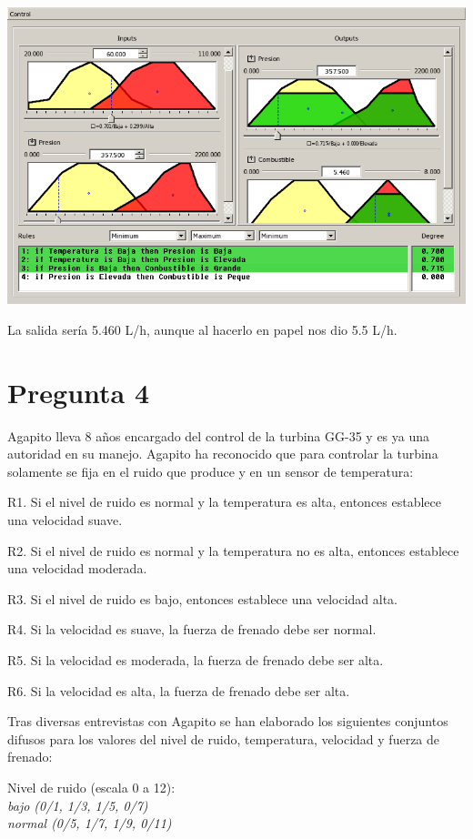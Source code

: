 \documentclass{article}
\newcommand\tab[1][1cm]{\hspace*{#1}}
\begin{document}
\begin{center}
\includegraphics[scale=0.5]{images/ej32.png}
\end{center}

La salida sería 5.460 L/h, aunque al hacerlo en papel nos dio 5.5 L/h.

\section{Pregunta 4}

Agapito lleva 8 años encargado del control de la turbina GG-35 y es ya una autoridad en su manejo. Agapito ha reconocido que para controlar la turbina solamente
se fija en el ruido que produce y en un sensor de temperatura:

R1. Si el nivel de ruido es normal y la temperatura es alta, entonces establece una velocidad suave.

R2. Si el nivel de ruido es normal y la temperatura no es alta, entonces establece una velocidad moderada.

R3. Si el nivel de ruido es bajo, entonces establece una velocidad alta.

R4. Si la velocidad es suave, la fuerza de frenado debe ser normal.

R5. Si la velocidad es moderada, la fuerza de frenado debe ser alta.

R6. Si la velocidad es alta, la fuerza de frenado debe ser alta.

Tras diversas entrevistas con Agapito se han elaborado los siguientes conjuntos difusos para los valores del nivel de ruido, temperatura, velocidad y fuerza de frenado:

Nivel de ruido (escala 0 a 12):\\
\tab \textit{bajo (0/1, 1/3, 1/5, 0/7)}\\
\tab \textit{normal (0/5, 1/7, 1/9, 0/11)}
\end{document}
